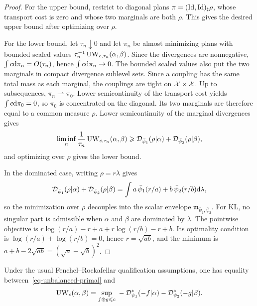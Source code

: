 \begin{proof}
	For the upper bound, restrict to diagonal plans $\pi=(\mathrm{Id},\mathrm{Id})_\sharp\rho$, whose transport cost is zero and whose two marginals are both $\rho$. This gives the desired upper bound after optimizing over $\rho$.

	For the lower bound, let $\tau_n\downarrow0$ and let $\pi_n$ be almost minimizing plans with bounded scaled values $\tau_n^{-1}\operatorname{UW}_{c,\tau_n}(\alpha,\beta)$. Since the divergences are nonnegative, $\int c\mathrm{d}\pi_n=O(\tau_n)$, hence $\int c\mathrm{d}\pi_n\to0$. The bounded scaled values also put the two marginals in compact divergence sublevel sets. Since a coupling has the same total mass as each marginal, the couplings are tight on $\mathcal{X}\times\mathcal{X}$. Up to subsequences, $\pi_n\rightharpoonup\pi_0$. Lower semicontinuity of the transport cost yields $\int c\mathrm{d}\pi_0=0$, so $\pi_0$ is concentrated on the diagonal. Its two marginals are therefore equal to a common measure $\rho$. Lower semicontinuity of the marginal divergences gives
	\[
		\liminf_n\frac1{\tau_n}\operatorname{UW}_{c,\tau_n}(\alpha,\beta)
		\geqslant
		\mathcal{D}_{\bar\psi_1}(\rho|\alpha)+\mathcal{D}_{\bar\psi_2}(\rho|\beta),
	\]
	and optimizing over $\rho$ gives the lower bound.

	In the dominated case, writing $\rho=r\lambda$ gives
	\[
		\mathcal{D}_{\bar\psi_1}(\rho|\alpha)+\mathcal{D}_{\bar\psi_2}(\rho|\beta)
		=
		\int
		a\,\bar\psi_1(r/a)+b\,\bar\psi_2(r/b)
		\mathrm{d}\lambda,
	\]
	so the minimization over $\rho$ decouples into the scalar envelope $\mathfrak m_{\bar\psi_1,\bar\psi_2}$. For KL, no singular part is admissible when $\alpha$ and $\beta$ are dominated by $\lambda$. The pointwise objective is $r\log(r/a)-r+a+r\log(r/b)-r+b$. Its optimality condition is $\log(r/a)+\log(r/b)=0$, hence $r=\sqrt{ab}$, and the minimum is $a+b-2\sqrt{ab}=(\sqrt a-\sqrt b)^2$.
\end{proof}

\begin{prop}\label{prop-dual-unbalanced-ot}
	Under the usual Fenchel--Rockafellar qualification assumptions, one has equality between~\eqref{eq-unbalanced-primal} and
	\[
		\operatorname{UW}_c(\alpha,\beta)
		=
		\underset{f\oplus g\leqslant c}{\sup}\;
		-
		\mathcal{D}_{\psi_1}^*(-f|\alpha)
		-
		\mathcal{D}_{\psi_2}^*(-g|\beta).
	\]
\end{prop}

